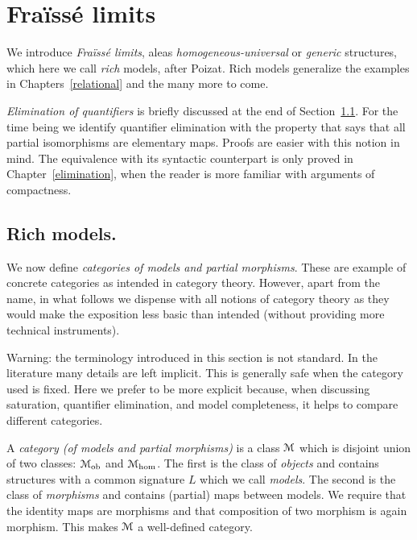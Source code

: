 \documentclass[creche.tex]{subfiles}
\begin{document}
\chapter{Fra\"issé limits}
\label{fraisse} 

\def\ceq#1#2#3{\parbox[b]{20ex}{$\displaystyle #1$}\parbox[b]{4ex}{\hfil$#2$}$\displaystyle #3$}

We introduce \textit{Fra\"iss\'e limits}, aleas \textit{homogeneous-universal\/} or \textit{generic\/} structures, which here we call \textit{rich\/} models, after Poizat. Rich models generalize the examples in Chapters~\ref{relational} and the many more to come.

\textit{Elimination of quantifiers} is briefly discussed at the end of Section~\ref{rich}. For the time being we identify  quantifier elimination with the property that says that all partial isomorphisms are elementary maps. Proofs are easier with this notion in mind. The equivalence with its syntactic counterpart is only proved in Chapter~\ref{elimination}, when the reader is more familiar with arguments of compactness.

\section{Rich models.}\label{rich}
We now define \textit{categories of models and partial morphisms}. These are example of concrete categories as intended in category theory. However, apart from the name, in what follows we dispense with all notions of category theory as they would make the exposition less basic than intended (without providing more technical instruments). %

\noindent\llap{\textcolor{red}{\Large\danger}\kern1.5ex}Warning: the terminology introduced in this section is not standard. In the literature many details are left implicit. This is generally safe when the category used is fixed. Here we prefer to be more explicit because, when discussing saturation, quantifier elimination, and model completeness, it helps to compare different categories.

A \emph{category (of models and partial morphisms)\/} is a class $\EuScript M$ which is disjoint union of two classes: \emph{$\EuScript M_{\textrm{ob}}$} and \emph{$\EuScript M_{\textrm{hom}}$}. The first is the class of \emph{objects\/} and contains structures with a common signature $L$ which we call \emph{models}. The second is the class of \emph{morphisms\/} and contains (partial) maps between models. We require that the identity maps are morphisms and that composition of two morphism is again morphism. This makes $\EuScript M$ a well-defined category. 
\end{document}
